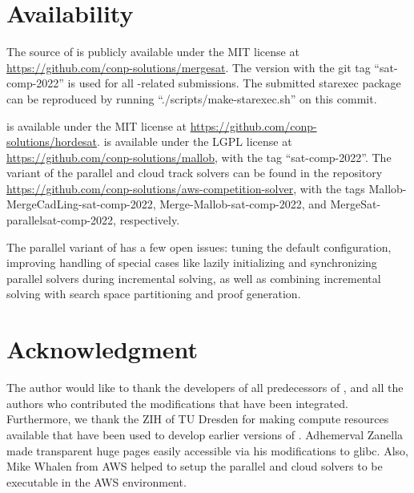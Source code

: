 \documentclass[conference]{IEEEtran}
\begin{document}
\section{Availability}

The source of \mergesat is publicly available under the MIT license at \url{https://github.com/conp-solutions/mergesat}.
The version with the git tag ``sat-comp-2022'' is used for all \mergesat-related submissions.
The submitted starexec package can be reproduced by running ``./scripts/make-starexec.sh'' on this commit.

\mergehordesat is available under the MIT license at \url{https://github.com/conp-solutions/hordesat}.
\mergemallob is available under the LGPL license at \url{https://github.com/conp-solutions/mallob}, with the tag ``sat-comp-2022''.
The variant of the parallel and cloud track solvers can be found in the repository \url{https://github.com/conp-solutions/aws-competition-solver}, with the tags
Mallob-MergeCadLing-sat-comp-2022,
Merge-Mallob-sat-comp-2022, and
MergeSat-parallelsat-comp-2022, respectively.

The parallel variant of \mergesat has a few open issues: tuning the default configuration, improving handling of special cases like lazily initializing and synchronizing parallel solvers during incremental solving, as well as combining incremental solving with search space partitioning and proof generation.

\section*{Acknowledgment}

The author would like to thank the developers of all predecessors of \mergesat, and all the authors who contributed the modifications that have been integrated.
Furthermore, we thank the ZIH of TU Dresden for making compute resources available that have been used to develop earlier versions of \mergesat.
Adhemerval Zanella made transparent huge pages easily accessible via his modifications to glibc.
Also, Mike Whalen from AWS helped to setup the parallel and cloud solvers to be executable in the AWS environment.



\end{document}
